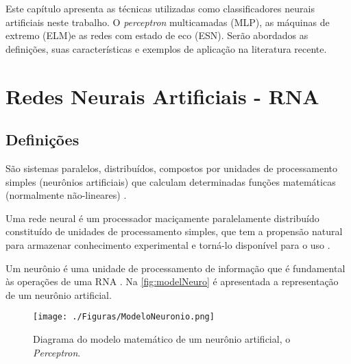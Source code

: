
Este capítulo apresenta as técnicas utilizadas como classificadores neurais artificiais neste trabalho. O \textit{perceptron} multicamadas (MLP), as máquinas de extremo (ELM)e as redes com estado de eco (ESN). Serão abordados as definições, suas características e exemplos de aplicação na literatura recente.




\section{Redes Neurais Artificiais - RNA}

\subsection{Definições}
\begin{citacao}
	São sistemas paralelos, distribuídos, compostos por unidades de processamento simples (neurônios artificiais) que calculam determinadas funções matemáticas (normalmente não-lineares) \cite{book:braga2007}.
\end{citacao}
\begin{citacao}
	Uma rede neural é um processador maciçamente paralelamente distribuído constituído de unidades de processamento simples, que tem a propensão natural para armazenar conhecimento experimental e torná-lo disponível para o uso \cite[p. 2]{book:simonhaykin2008}.
\end{citacao}

Um neurônio é uma unidade de processamento de informação que é fundamental às operações de uma RNA \cite{book:simonhaykin2008}. Na \autoref{fig:modelNeuro} é apresentada a representação de um neurônio artificial.

\begin{figure}[H]
	\begin{center}   
		\caption{Diagrama do modelo matemático de um neurônio artificial, o \textit{Perceptron}.}
		\label{fig:modelNeuro}
		\texttt{[image: ./Figuras/ModeloNeuronio.png]}
	\end{center}
\end{figure}

